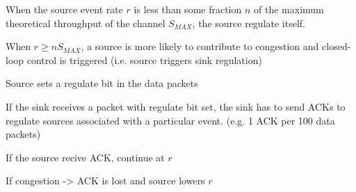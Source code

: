 When the source event rate $r$ is less than some fraction $n$ of
the maximum theoretical throughput of the channel $S_{MAX}$, the
source regulate itself.

When $r \geq nS_{MAX}$, a source is more likely to contribute to congestion and
closed-loop control is triggered (i.e. source triggers sink regulation)

\begin{description}
	\item Source sets a regulate bit in the data packets
	\item If the sink receives a packet with regulate bit set, the sink has to
		send ACKs to regulate sources associated with a particular event. (e.g.
		1 ACK per 100 data packets)
	\item If the source recive ACK, continue at $r$
	\item If congestion -> ACK is lost and source lowers $r$
\end{description}


